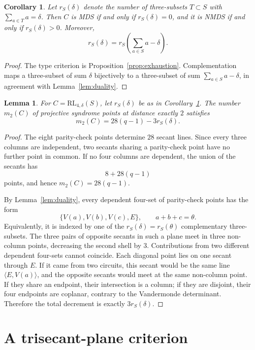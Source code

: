 ﻿\documentclass[11pt]{article}
\newcommand{\RL}{\mathrm{RL}}
\theoremstyle{plain}
\newtheorem{lemma}[theorem]{Lemma}
\newtheorem{corollary}[theorem]{Corollary}
\theoremstyle{definition}
\begin{document}
\begin{corollary}
\label{cor:duality-mds}
Let \(r_S(\delta)\) denote the number of three-subsets \(T\subset S\) with
\(\sum_{a\in T}a=\delta\).  Then \(C\) is MDS if and only if
\(r_S(\delta)=0\), and it is NMDS if and only if \(r_S(\delta)>0\).
Moreover,
\[
  r_S(\delta)=r_S\left(\sum_{a\in S}a-\delta\right).
\]
\end{corollary}

\begin{proof}
The type criterion is Proposition~\ref{prop:exhaustion}.  Complementation
maps a three-subset of sum \(\delta\) bijectively to a three-subset of sum
\(\sum_{a\in S}a-\delta\), in agreement with
Lemma~\ref{lem:duality}.
\end{proof}

\begin{lemma}\label{lem:second-shell}
For \(C=\RL_{4,\delta}(S)\), let \(r_S(\delta)\) be as in
Corollary~\ref{cor:duality-mds}.  The number \(m_2(C)\) of projective
syndrome points at distance exactly \(2\) satisfies
\[
  m_2(C)=28(q-1)-3r_S(\delta).
\]
\end{lemma}

\begin{proof}
The eight parity-check points determine \(28\) secant lines.  Since every
three columns are independent, two secants sharing a parity-check point have
no further point in common.  If no four columns are dependent, the union of
the secants has
\[
  8+28(q-1)
\]
points, and hence \(m_2(C)=28(q-1)\).

By Lemma~\ref{lem:duality}, every dependent four-set of parity-check
points has the form
\[
  \{V(a),V(b),V(c),E\},\qquad a+b+c=\theta.
\]
Equivalently, it is indexed by one of the
\(r_S(\delta)=r_S(\theta)\) complementary three-subsets.
The three pairs of opposite secants in such a plane meet in three
non-column points, decreasing the second shell by \(3\).  Contributions from
two different dependent four-sets cannot coincide.  Each diagonal point
lies on one secant through \(E\).  If it came from two circuits, this
secant would be the same line \(\langle E,V(a)\rangle\), and the opposite
secants would meet at the same non-column point.  If they share an endpoint,
their intersection is a column; if they are disjoint, their four endpoints
are coplanar, contrary to the Vandermonde determinant.
Therefore the total decrement is exactly \(3r_S(\delta)\).
\end{proof}

\section{A trisecant-plane criterion}
\end{document}

